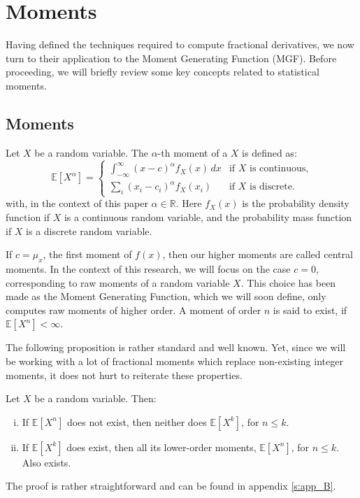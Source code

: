 \section{Moments}\label{s: moments}
Having defined the techniques required to compute fractional derivatives, we now turn to their application to the Moment Generating Function (MGF). Before proceeding, we will briefly review some key concepts related to statistical moments.
\subsection{Moments}
\begin{definition}
    Let \(X\) be a random variable.
    The \(\alpha\)-th moment of a \(X\) is defined as:
   \[
\mathbb{E}[X^\alpha] = 
\begin{cases} 
\int_{-\infty}^{\infty} (x - c)^\alpha f_X(x) \, dx & \text{if } X \text{ is continuous,} \\ 
\sum_{i} (x_i - c_ i)^\alpha f_X(x_i) & \text{if } X \text{ is discrete.} 
\end{cases}
\] with, in the context of this paper \(\alpha \in \mathbb{R}\). Here \(f_X(x)\) is the probability density function if \(X\) is a continuous random variable, and the probability mass function if \(X\) is a discrete random variable.
\end{definition}

If \(c = \mu_x\), the first moment of \(f(x)\), then our higher moments are called central moments. In the context of this research, we will focus on the case \(c = 0\), corresponding to raw moments of a random variable \(X\). This choice has been made as the Moment Generating Function, which we will soon define, only computes raw moments of higher order. A moment of order \(n\) is said to exist, if \(\mathbb{E}[X^n] < \infty\).

The following proposition is rather standard and well known. Yet, since we will be working with a lot of fractional moments which replace non-existing integer moments, it does not hurt to reiterate these properties.

\begin{proposition}\label{p: moments_1}
    Let \(X\) be a random variable. Then:
    \begin{enumerate}[(i)]
        \item If \(\mathbb{E}[X^n]\) does not exist, then neither does \(\mathbb{E}[X^k]\), for \( n \leq k\).
    
    \item If \(\mathbb{E}[X^k]\) does exist, then all its lower-order moments, \(\mathbb{E}[X^n]\), for \(n \leq k\). Also exists.
\end{enumerate}
\end{proposition}
The proof is rather straightforward and can be found in appendix \ref{s:app_B}.


